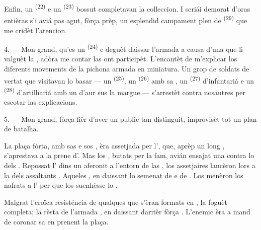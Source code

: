 Enfin, un  \textsuperscript{(22)} e un 
\textsuperscript{(23)} bossut completavan la colleccion. I seriái demorat d'oras
entièras s'i aviá pas agut, fòrça prèp, un esplendid campament plen de
 \textsuperscript{(29)} que me cridèt l'atencion.

\VUsaut{4.0mm}
\VUsaut{2.8mm}

4. --- Mon grand, qu'es un  \textsuperscript{(24)} e
deguèt daissar l'armada a causa d'una  que li valguèt la
, adòra me contar las  ont participèt.
L'encantèt de m'explicar los diferents movements de la pichona armada en
miniatura. Un grop de soldats de vertat que visitavan lo basar --- un
 \textsuperscript{(25)}, un 
\textsuperscript{(26)} amb sa , un 
\textsuperscript{(27)} d'infantariá e un  \textsuperscript{(28)}
d'artilhariá amb un  d'aur sus la margue --- s'arrestèt contra
nosautres per escotar las explicacions.

5. --- Mon grand, fòrça fièr d'aver un public tan distinguit, improvisèt tot un
plan de batalha.

La plaça fòrta, amb sas  e sos , èra assetjada
per l', que, aprèp un long ,
s'aprestava a la prene d'. Mas los , butats per
la fam, avián ensajat una  contra lo  dels
. Repossat l' dins un 
aferonit a l'entorn de las , los assetjaires 
lancèron lors  a la  dels assaltants
. Aqueles , en daissant lo  semenat de  e de . Los
 menèron los nafrats a l' per que los
suenhèsse lo .

Malgrat l'eroïca resisténcia de qualques  que s'èran formats en
, la  foguèt completa; la rèsta de l'armada
, en daissant darrièr fòrça . L'enemic èra a
mand de coronar sa  en prenent la plaça.

